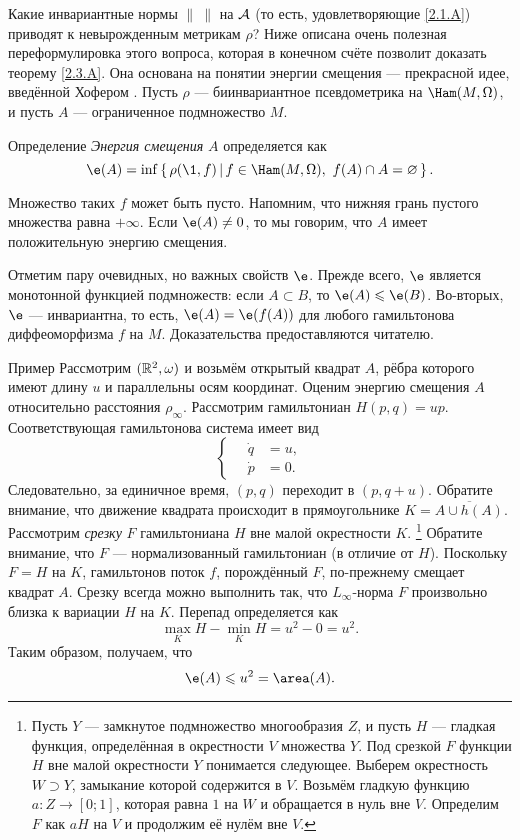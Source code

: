 Какие инвариантные нормы $\|\ \|$ на $\mathcal{A}$ (то есть, удовлетворяющие \ref{2.1.A}) приводят к невырожденным метрикам $\rho$?
Ниже описана очень полезная переформулировка этого вопроса, которая в конечном счёте позволит доказать теорему \ref{2.3.A}.
Она основана на понятии энергии смещения — прекрасной идее, введённой Хофером \cite{H1}.
Пусть $\rho$ — биинвариантное псевдометрика на $\Ham (M, \Omega)$, и пусть $A$ — ограниченное подмножество $M$.

\begin{ex*}{Определение}
\emph{Энергия смещения} $A$ определяется как 
\[\e(A) = \inf \set{\rho (\1, f)}{f \in \Ham (M, \Omega),\  f (A) \cap A = \emptyset}.\]
\end{ex*}

Множество таких $f$ может быть пусто.
Напомним, что нижняя грань пустого множества равна $+\infty$.
Если $\e (A) \ne 0$, то мы говорим, что $A$ имеет положительную энергию смещения.

Отметим пару очевидных, но важных свойств $\e$.
Прежде всего, $\e$ является монотонной функцией подмножеств: если $A \subset B$, то $\e(A) \le \e(B)$.
Во-вторых, $\e$ — инвариантна, то есть, $\e(A) = \e(f(A))$ для любого гамильтонова диффеоморфизма $f$ на $M$.
Доказательства предоставляются читателю.

\begin{ex*}{Пример}
Рассмотрим $(\mathbb{R}^2, \omega)$ и возьмём открытый квадрат $A$, рёбра которого имеют длину $u$ и параллельны осям координат.
Оценим энергию смещения $A$ относительно расстояния $\rho_\infty$.
Рассмотрим гамильтониан $H (p, q) = up$.
Соответствующая гамильтонова система имеет вид 
\[
\begin{cases}
\quad\dot q &= u,
\\
\quad\dot p &= 0.
\end{cases}
\]
Следовательно, за единичное время, $(p, q)$ переходит в $(p, q + u)$.
Обратите внимание, что движение квадрата происходит в прямоугольнике
$K = \overline{A \cup h (A)}$. 
Рассмотрим \emph{срезку} $F$ гамильтониана $H$ вне малой окрестности $K$.%
\footnote{Пусть $Y$ — замкнутое подмножество многообразия $Z$, и пусть
  $H$ — гладкая функция, определённая в окрестности $V$ множества
  $Y$. 
  Под срезкой $F$ функции $H$ вне малой окрестности $Y$ понимается следующее.
  Выберем окрестность $W\supset Y$, замыкание которой содержится в $V$.
  Возьмём гладкую функцию $a\colon Z \to [0; 1]$, которая равна $1$ на
  $W$ и обращается в нуль вне $V$. 
  Определим $F$ как $aH$ на $V$ и продолжим её нулём вне $V$.}
Обратите внимание, что $F$ — нормализованный гамильтониан (в отличие от $H$).
Поскольку $F = H$ на $K$, гамильтонов поток $f$, порождённый $F$,
по-прежнему смещает квадрат $A$. 
Срезку всегда можно выполнить так, что $L_\infty$-норма $F$ произвольно близка к вариации $H$ на $K$.
Перепад определяется как 
\[\max_K H - \min_K H = u^2 - 0 = u^2.\]
Таким образом, получаем, что 
\[\e (A) \le u^2 = \area (A).\]
\end{ex*}

